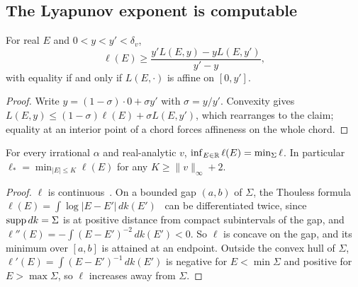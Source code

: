 \subsection{The Lyapunov exponent is computable}

\begin{lemma}\label{lem:chord}
For real $E$ and $0<y<y'<\delta_v$,
\[
\ell(E)\ge\frac{y'L(E,y)-yL(E,y')}{y'-y},
\]
with equality if and only if $L(E,\cdot)$ is affine on $[0,y']$.
\end{lemma}

\begin{proof}
Write $y=(1-\sigma)\cdot0+\sigma y'$ with $\sigma=y/y'$. Convexity gives $L(E,y)\le(1-\sigma)\ell(E)+\sigma L(E,y')$, which rearranges to the claim; equality at an interior point of a chord forces affineness on the whole chord.
\end{proof}

\begin{lemma}\label{lem:minonsigma}
For every irrational $\alpha$ and real-analytic $v$, $\inf_{E\in\mathbb R}\ell(E)=\min_\Sigma\ell$. In particular $\ell_*=\min_{|E|\le K}\ell(E)$ for any $K\ge\|v\|_\infty+2$.
\end{lemma}

\begin{proof}
$\ell$ is continuous~\cite{BourgainJitomirskaya2002}. On a bounded gap $(a,b)$ of $\Sigma$, the Thouless formula $\ell(E)=\int\log|E-E'|\,dk(E')$~\cite{CraigSimon1983} can be differentiated twice, since $\operatorname{supp} dk=\Sigma$ is at positive distance from compact subintervals of the gap, and $\ell''(E)=-\int(E-E')^{-2}\,dk(E')<0$. So $\ell$ is concave on the gap, and its minimum over $[a,b]$ is attained at an endpoint. Outside the convex hull of $\Sigma$, $\ell'(E)=\int(E-E')^{-1}\,dk(E')$ is negative for $E<\min\Sigma$ and positive for $E>\max\Sigma$, so $\ell$ increases away from $\Sigma$.
\end{proof}

